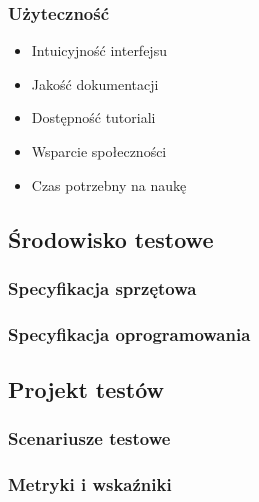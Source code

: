 \subsubsection{Użyteczność}
\begin{itemize}
    \item Intuicyjność interfejsu
    \item Jakość dokumentacji
    \item Dostępność tutoriali
    \item Wsparcie społeczności
    \item Czas potrzebny na naukę
\end{itemize}

\subsection{Środowisko testowe}
\subsubsection{Specyfikacja sprzętowa}

\subsubsection{Specyfikacja oprogramowania}

\subsection{Projekt testów}
\subsubsection{Scenariusze testowe}

\subsubsection{Metryki i wskaźniki}
